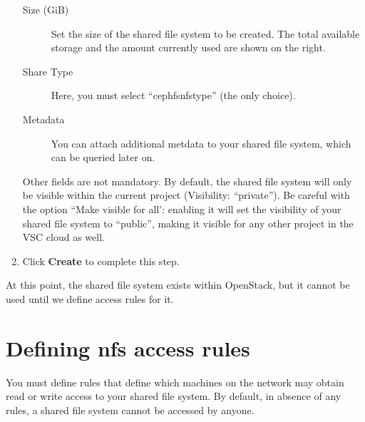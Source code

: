 \begin{enumerate}
\begin{description}
  \item[Size (GiB)] Set the size of the shared file system to be
    created.  The total available storage and the amount currently
    used are shown on the right.
  \item[Share Type] Here, you must select ``cephfsnfstype'' (the only choice).
  \item[Metadata] You can attach additional metdata to your shared
    file system, which can be queried later on.
  \end{description}
  Other fields are not mandatory.  By default, the shared file system
  will only be visible within the current project (Visibility:
  ``private'').  Be careful with the option ``Make visible for all':
  enabling it will set the visibility of your shared file system to
  ``public'', making it visible for any other project in the VSC cloud
  as well.
\item Click \textbf{Create} to complete this step.
\end{enumerate}

At this point, the shared file system exists within OpenStack, but it cannot be used until we define access rules for it.

\section*{Defining \gls{nfs} access rules}\label{sec:defin-nfs-access}
You must define rules that define which machines on the network may
obtain read or write access to your shared file system.  By default,
in absence of any rules, a shared file system cannot be accessed by
anyone.

